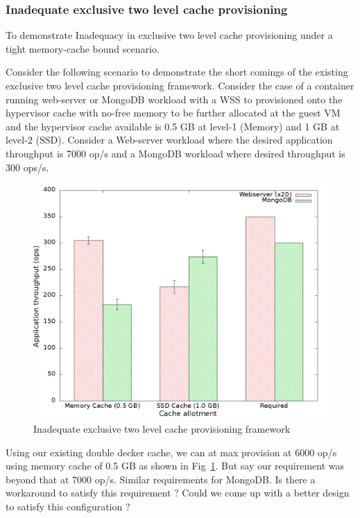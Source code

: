 	\subsubsection{Inadequate exclusive two level cache provisioning}
	\label{sec:dd_hybrid_motivation}
	  
	    To demonstrate Inadequacy in exclusive two level cache provisioning under a tight memory-cache bound
	    scenario.  
	    
	    Consider the following scenario to demonstrate the short comings of the existing exclusive two level cache
	    provisioning framework. Consider the case of a container running web-server or MongoDB workload
	    with a WSS to provisioned onto the hypervisor cache with  no-free memory to be further allocated 
	    at the guest VM and the hypervisor cache available is 0.5 GB at level-1 (Memory) and 1 GB at 
	    level-2 (SSD). Consider a Web-server workload where the desired application throughput is 7000 op/s
	    and a MongoDB workload where desired throughput is 300 ops/s.
	    
	  \begin{figure}
	    \centering
	    \includegraphics[scale=0.30]{images/dd_hybrid_motivation/throughput.png}
	    \caption{Inadequate exclusive two level cache provisioning framework}
	    \label{plot:dd_hybrid_motivation}
	  \end{figure}
	  
	    Using our existing double decker cache, we can at max provision at 6000 op/s using memory cache of 0.5 GB as 
	    shown in Fig~\ref{plot:dd_hybrid_motivation}. But say our requirement was beyond that at 7000 op/s. Similar
	    requirements for MongoDB. Is there a workaround to satisfy this requirement ? Could we come up with a 
	    better design to satisfy this configuration ?
	    

